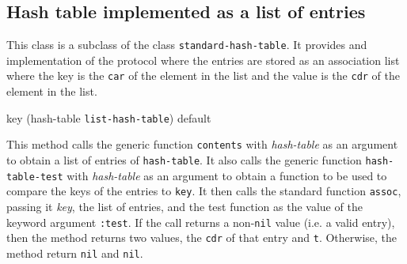 \subsection{Hash table implemented as a list of entries}


This class is a subclass of the class \texttt{standard-hash-table}.
It provides and implementation of the protocol where the entries are
stored as an association list where the key is the \texttt{car} of the
element in the list and the value is the \texttt{cdr} of the element
in the list.

{\small{} {key (hash-table {\tt list-hash-table})
    \optional default}
}

This method calls the generic function \texttt{contents} with
\textit{hash-table} as an argument to obtain a list of entries of
\texttt{hash-table}.  It also calls the generic function
\texttt{hash-table-test} with \textit{hash-table} as an argument to
obtain a function to be used to compare the keys of the entries to
\texttt{key}.  It then calls the standard \commonlisp function
\texttt{assoc}, passing it \textit{key}, the list of entries, and the
test function as the value of the keyword argument \texttt{:test}.  If
the call returns a non-\texttt{nil} value (i.e. a valid entry), then
the method returns two values, the \texttt{cdr} of that entry and
\texttt{t}.  Otherwise, the method return \texttt{nil} and
\texttt{nil}.
